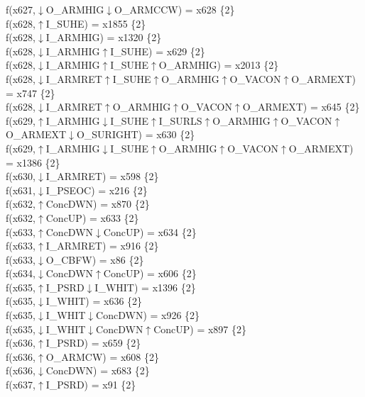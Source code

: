 f(x627,$\downarrow$O\_ARMHIG$\downarrow$O\_ARMCCW) = x628 \{2\} \\  
f(x628,$\uparrow$I\_SUHE) = x1855 \{2\} \\  
f(x628,$\downarrow$I\_ARMHIG) = x1320 \{2\} \\  
f(x628,$\downarrow$I\_ARMHIG$\uparrow$I\_SUHE) = x629 \{2\} \\  
f(x628,$\downarrow$I\_ARMHIG$\uparrow$I\_SUHE$\uparrow$O\_ARMHIG) = x2013 \{2\} \\  
f(x628,$\downarrow$I\_ARMRET$\uparrow$I\_SUHE$\uparrow$O\_ARMHIG$\uparrow$O\_VACON$\uparrow$O\_ARMEXT) = x747 \{2\} \\  
f(x628,$\downarrow$I\_ARMRET$\uparrow$O\_ARMHIG$\uparrow$O\_VACON$\uparrow$O\_ARMEXT) = x645 \{2\} \\  
f(x629,$\uparrow$I\_ARMHIG$\downarrow$I\_SUHE$\uparrow$I\_SURLS$\uparrow$O\_ARMHIG$\uparrow$O\_VACON$\uparrow$O\_ARMEXT$\downarrow$O\_SURIGHT) = x630 \{2\} \\  
f(x629,$\uparrow$I\_ARMHIG$\downarrow$I\_SUHE$\uparrow$O\_ARMHIG$\uparrow$O\_VACON$\uparrow$O\_ARMEXT) = x1386 \{2\} \\  
f(x630,$\downarrow$I\_ARMRET) = x598 \{2\} \\  
f(x631,$\downarrow$I\_PSEOC) = x216 \{2\} \\  
f(x632,$\uparrow$ConcDWN) = x870 \{2\} \\  
f(x632,$\uparrow$ConcUP) = x633 \{2\} \\  
f(x633,$\uparrow$ConcDWN$\downarrow$ConcUP) = x634 \{2\} \\  
f(x633,$\uparrow$I\_ARMRET) = x916 \{2\} \\  
f(x633,$\downarrow$O\_CBFW) = x86 \{2\} \\  
f(x634,$\downarrow$ConcDWN$\uparrow$ConcUP) = x606 \{2\} \\  
f(x635,$\uparrow$I\_PSRD$\downarrow$I\_WHIT) = x1396 \{2\} \\  
f(x635,$\downarrow$I\_WHIT) = x636 \{2\} \\  
f(x635,$\downarrow$I\_WHIT$\downarrow$ConcDWN) = x926 \{2\} \\  
f(x635,$\downarrow$I\_WHIT$\downarrow$ConcDWN$\uparrow$ConcUP) = x897 \{2\} \\  
f(x636,$\uparrow$I\_PSRD) = x659 \{2\} \\  
f(x636,$\uparrow$O\_ARMCW) = x608 \{2\} \\  
f(x636,$\downarrow$ConcDWN) = x683 \{2\} \\  
f(x637,$\uparrow$I\_PSRD) = x91 \{2\} \\  
